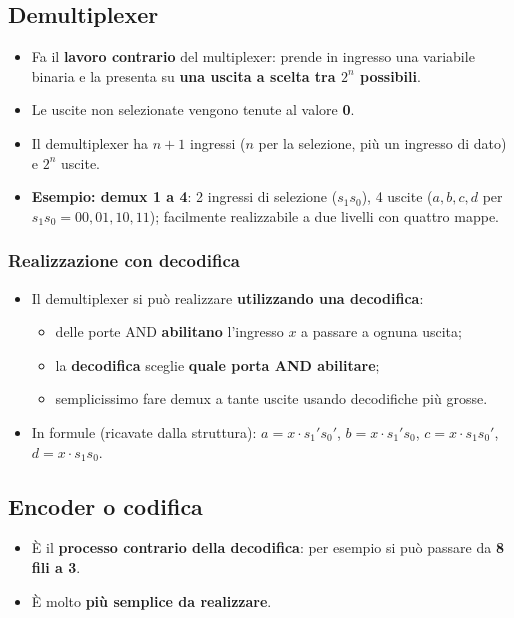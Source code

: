 \documentclass[12pt, a4paper]{article}
\begin{document}
\subsection{Demultiplexer}
\begin{itemize}
    \item Fa il \textbf{lavoro contrario} del multiplexer: prende in ingresso una variabile binaria e la presenta su \textbf{una uscita a scelta tra $2^n$ possibili}.
    \item Le uscite non selezionate vengono tenute al valore \textbf{0}.
    \item Il demultiplexer ha $n + 1$ ingressi ($n$ per la selezione, più un ingresso di dato) e $2^n$ uscite.
    \item \textbf{Esempio: demux 1 a 4}: 2 ingressi di selezione ($s_1 s_0$), 4 uscite ($a, b, c, d$ per $s_1 s_0 = 00, 01, 10, 11$); facilmente realizzabile a due livelli con quattro mappe.
\end{itemize}

\subsubsection{Realizzazione con decodifica}
\begin{itemize}
    \item Il demultiplexer si può realizzare \textbf{utilizzando una decodifica}:
    \begin{itemize}
        \item delle porte AND \textbf{abilitano} l'ingresso $x$ a passare a ognuna uscita;
        \item la \textbf{decodifica} sceglie \textbf{quale porta AND abilitare};
        \item semplicissimo fare demux a tante uscite usando decodifiche più grosse.
    \end{itemize}
    \item In formule (ricavate dalla struttura): $a = x \cdot s_1's_0'$, \quad $b = x \cdot s_1's_0$, \quad $c = x \cdot s_1s_0'$, \quad $d = x \cdot s_1s_0$.
\end{itemize}

\subsection{Encoder o codifica}
\begin{itemize}
    \item È il \textbf{processo contrario della decodifica}: per esempio si può passare da \textbf{8 fili a 3}.
    \item È molto \textbf{più semplice da realizzare}.
\end{itemize}
\end{document}
